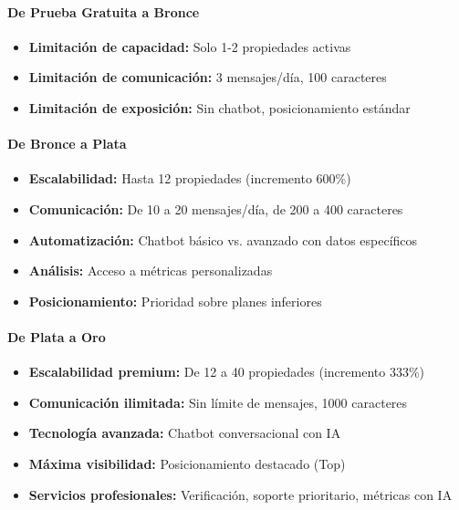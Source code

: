 					\paragraph{De Prueba Gratuita a Bronce}
					\begin{itemize}
						\item \textbf{Limitación de capacidad:} Solo 1-2 propiedades activas
						\item \textbf{Limitación de comunicación:} 3 mensajes/día, 100 caracteres
						\item \textbf{Limitación de exposición:} Sin chatbot, posicionamiento estándar
					\end{itemize}
					
					\paragraph{De Bronce a Plata}
					\begin{itemize}
						\item \textbf{Escalabilidad:} Hasta 12 propiedades (incremento 600\%)
						\item \textbf{Comunicación:} De 10 a 20 mensajes/día, de 200 a 400 caracteres
						\item \textbf{Automatización:} Chatbot básico vs. avanzado con datos específicos
						\item \textbf{Análisis:} Acceso a métricas personalizadas
						\item \textbf{Posicionamiento:} Prioridad sobre planes inferiores
					\end{itemize}
					
					\paragraph{De Plata a Oro}
					\begin{itemize}
						\item \textbf{Escalabilidad premium:} De 12 a 40 propiedades (incremento 333\%)
						\item \textbf{Comunicación ilimitada:} Sin límite de mensajes, 1000 caracteres
						\item \textbf{Tecnología avanzada:} Chatbot conversacional con IA
						\item \textbf{Máxima visibilidad:} Posicionamiento destacado (Top)
						\item \textbf{Servicios profesionales:} Verificación, soporte prioritario, métricas con IA
					\end{itemize}
	

